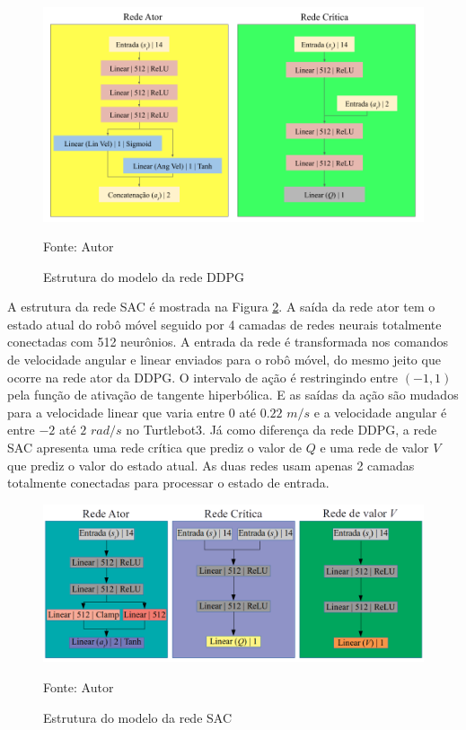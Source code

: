 \vspace{0.25cm}
\begin{figure}[H]
\caption{Estrutura do modelo da rede DDPG}
\centerline{\includegraphics[width=\columnwidth]{imagens/ddpg_structure.png}}
\small{Fonte: Autor}
\label{fig:ddpg_struct}
\end{figure}

A estrutura da rede SAC é mostrada na Figura \ref{fig:sac_struct}.
A saída da rede ator tem o estado atual do robô móvel seguido por 4 camadas de redes neurais totalmente conectadas com 512 neurônios.
A entrada da rede é transformada nos comandos de velocidade angular e linear enviados para o robô móvel, do mesmo jeito que ocorre na rede ator da DDPG.
O intervalo de ação é restringindo entre $(-1,1)$ pela função de ativação de tangente hiperbólica. 
E as saídas da ação são mudados para a velocidade linear que varia entre $0$ até $0.22$ $m/s$ e a velocidade angular é entre $-2$ até $2$ $rad/s$ no Turtlebot3.
Já como diferença da rede DDPG, a rede SAC apresenta uma rede crítica que prediz o valor de $Q$ e uma rede de valor $V$ que prediz o valor do estado atual.
As duas redes usam apenas 2 camadas totalmente conectadas para processar o estado de entrada.

\vspace{0.25cm}
\begin{figure}[H]
\caption{Estrutura do modelo da rede SAC}
\centerline{\includegraphics[width=\columnwidth]{imagens/sac_structure.png}}
\small{Fonte: Autor}
\label{fig:sac_struct}
\end{figure}

